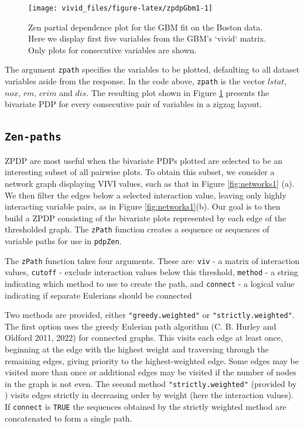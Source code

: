 \begin{figure}

{\centering \texttt{[image: vivid\_files/figure-latex/zpdpGbm1-1]} 

}

\caption{Zen partial dependence plot for the GBM fit on the Boston data. Here we display first five variables from the GBM's `vivid` matrix. Only plots for consecutive variables are shown.}\label{fig:zpdpGbm1}
\end{figure}

The argument \texttt{zpath} specifies the variables to be plotted, defaulting to all dataset variables aside from the response. In the code above, \texttt{zpath} is the vector \(lstat\), \(nox\), \(rm\), \(crim\) and \(dis\). The resulting plot shown in Figure \ref{fig:zpdpGbm1} presents the bivariate PDP for every consecutive pair of variables in a zigzag layout.

\hypertarget{sec:zp}{%
\subsection{\texorpdfstring{\texttt{Zen-paths}}{Zen-paths}}\label{sec:zp}}

ZPDP are most useful when the bivariate PDPs plotted are selected to be an interesting subset of all pairwise plots. To obtain this subset, we consider a network graph displaying VIVI values, such as that in Figure \ref{fig:networks1} (a). We then filter the edges below a selected interaction value, leaving only highly interacting variable pairs, as in Figure \ref{fig:networks1}(b). Our goal is to then build a ZPDP consisting of the bivariate plots represented by each edge of the thresholded graph. The \texttt{zPath} function creates a sequence or sequences of variable paths for use in \texttt{pdpZen}.

The \texttt{zPath} function takes four arguments. These are:
\texttt{viv} - a matrix of interaction values,
\texttt{cutoff} - exclude interaction values below this threshold,
\texttt{method} - a string indicating which method to use to create the path, and
\texttt{connect} - a logical value indicating if separate Eulerians should be connected

Two methods are provided, either \texttt{"greedy.weighted"} or \texttt{"strictly.weighted"}. The first option uses the greedy Eulerian path algorithm (C. B. Hurley and Oldford 2011, 2022) for connected graphs. This visits each edge at least once, beginning at the edge with the highest weight and traversing through the remaining edges, giving priority to the highest-weighted edge. Some edges may be visited more than once or additional edges may be visited if the number of nodes in the graph is not even. The second method \texttt{"strictly.weighted"} (provided by ) visits edges strictly in decreasing order by weight (here the interaction values). If \texttt{connect} is \texttt{TRUE} the sequences obtained by the strictly weighted method are concatenated to form a single path.

